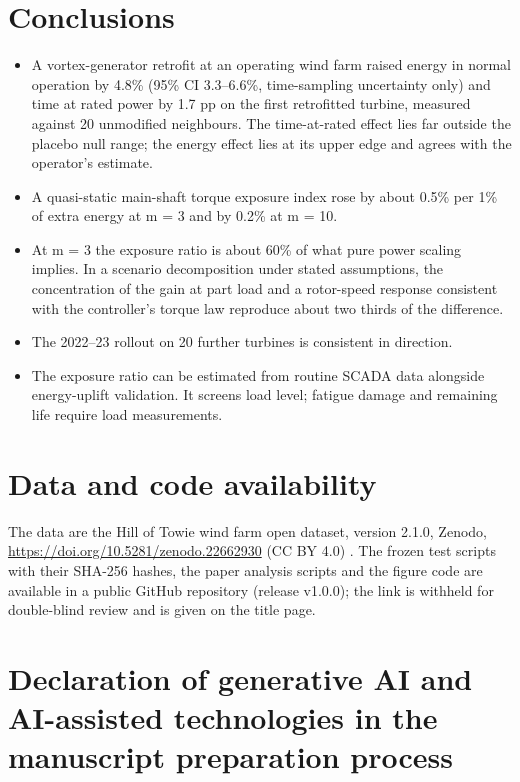 \documentclass[preprint,12pt]{elsarticle}
\begin{document}
\section{Conclusions}

\begin{itemize}
\item
  A vortex-generator retrofit at an operating wind farm raised energy in normal operation by 4.8\% (95\% CI 3.3--6.6\%, time-sampling uncertainty only) and time at rated power by 1.7 pp on the first retrofitted turbine, measured against 20 unmodified neighbours. The time-at-rated effect lies far outside the placebo null range; the energy effect lies at its upper edge and agrees with the operator's estimate.
\item
  A quasi-static main-shaft torque exposure index rose by about 0.5\% per 1\% of extra energy at m = 3 and by 0.2\% at m = 10.
\item
  At m = 3 the exposure ratio is about 60\% of what pure power scaling implies. In a scenario decomposition under stated assumptions, the concentration of the gain at part load and a rotor-speed response consistent with the controller's torque law reproduce about two thirds of the difference.
\item
  The 2022--23 rollout on 20 further turbines is consistent in direction.
\item
  The exposure ratio can be estimated from routine SCADA data alongside energy-uplift validation. It screens load level; fatigue damage and remaining life require load measurements.
\end{itemize}


\section*{Data and code availability}

The data are the Hill of Towie wind farm open dataset, version 2.1.0, Zenodo, \url{https://doi.org/10.5281/zenodo.22662930} (CC BY 4.0) \cite{hot}. The frozen test scripts with their SHA-256 hashes, the paper analysis scripts and the figure code are available in a public GitHub repository (release v1.0.0); the link is withheld for double-blind review and is given on the title page.

\section*{Declaration of generative AI and AI-assisted technologies in the manuscript preparation process}
\end{document}
